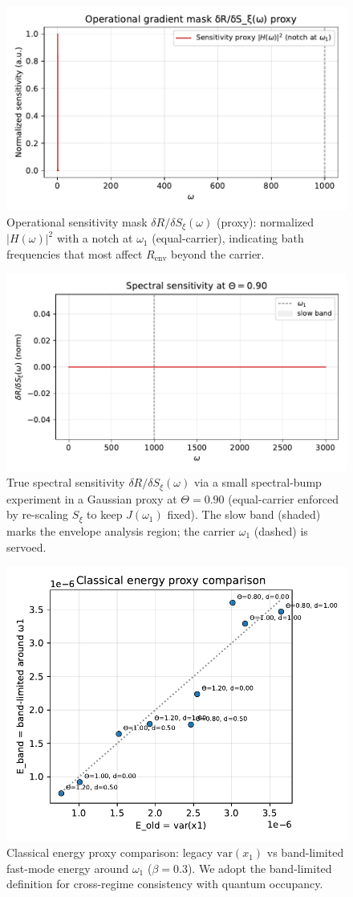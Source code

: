 \documentclass[11pt,letterpaper]{article}
\begin{document}
\begin{figure}[t]
\centering
\includegraphics[width=0.7\linewidth]{figM_sensitivity.pdf}
\caption{Operational sensitivity mask $\delta R/\delta S_\xi(\omega)$ (proxy): normalized $|H(\omega)|^2$ with a notch at $\omega_1$ (equal-carrier), indicating bath frequencies that most affect $R_{\mathrm{env}}$ beyond the carrier.}
\end{figure}

\begin{figure}[t]
\centering
\includegraphics[width=0.72\linewidth]{figM2_true_sensitivity.pdf}
\caption{True spectral sensitivity $\delta R/\delta S_\xi(\omega)$ via a small spectral-bump experiment in a Gaussian proxy at $\Theta=0.90$ (equal-carrier enforced by re-scaling $S_\xi$ to keep $J(\omega_1)$ fixed). The slow band (shaded) marks the envelope analysis region; the carrier $\omega_1$ (dashed) is servoed.}
\end{figure}

\begin{figure}[t]
\centering
\includegraphics[width=0.72\linewidth]{figN_energy_proxy_compare.pdf}
\caption{Classical energy proxy comparison: legacy $\mathrm{var}(x_1)$ vs band-limited fast-mode energy around $\omega_1$ ($\beta=0.3$). We adopt the band-limited definition for cross-regime consistency with quantum occupancy.}
\end{figure}
\end{document}

